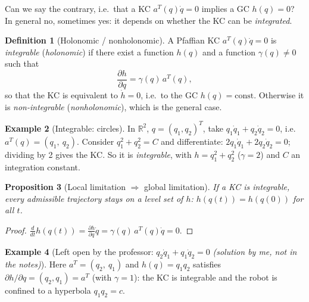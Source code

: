 \documentclass[11pt,a4paper]{article}
\theoremstyle{definition}
\newtheorem{definition}{Definition}[section]
\newtheorem{example}[definition]{Example}
\theoremstyle{plain}
\newtheorem{proposition}[definition]{Proposition}
\theoremstyle{remark}
\begin{document}
Can we say the contrary, i.e.\ that a KC $a^{T}(q)\dot q=0$ implies a GC $h(q)=0$? In general no, sometimes yes: it depends on whether the KC can be \emph{integrated}.
 
\begin{definition}[Holonomic / nonholonomic]
A Pfaffian KC $a^{T}(q)\dot q=0$ is \emph{integrable} (\emph{holonomic}) if there exist a function $h(q)$ and a function $\gamma(q)\neq0$ such that
\[
\frac{\partial h}{\partial q}=\gamma(q)\,a^{T}(q),
\]
so that the KC is equivalent to $\dot h=0$, i.e.\ to the GC $h(q)=\text{const}$. Otherwise it is \emph{non-integrable} (\emph{nonholonomic}), which is the general case.
\end{definition}
 
\begin{example}[Integrable: circles]\label{ex:circles}
In $\mathbb R^2$, $q=(q_1,q_2)^{T}$, take $q_1\dot q_1+q_2\dot q_2=0$, i.e.\ $a^{T}(q)=(q_1,\ q_2)$. Consider $q_1^2+q_2^2=C$ and differentiate: $2q_1\dot q_1+2q_2\dot q_2=0$; dividing by 2 gives the KC. So it is \emph{integrable}, with $h=q_1^2+q_2^2$ ($\gamma=2$) and $C$ an integration constant.
\end{example}
 
\begin{proposition}[Local limitation $\Rightarrow$ global limitation]\label{prop:l2g}
If a KC is integrable, every admissible trajectory stays on a level set of $h$: $h(q(t))=h(q(0))$ for all $t$.
\end{proposition}
\begin{proof}
$\frac{d}{dt}h(q(t))=\frac{\partial h}{\partial q}\dot q=\gamma(q)\,a^{T}(q)\dot q=0$.
\end{proof}
 
\begin{example}[Left open by the professor: $q_2\dot q_1+q_1\dot q_2=0$ \emph{(solution by me, not in the notes)}]
Here $a^{T}=(q_2,\ q_1)$ and $h(q)=q_1q_2$ satisfies $\partial h/\partial q=(q_2,q_1)=a^{T}$ (with $\gamma=1$): the KC is integrable and the robot is confined to a hyperbola $q_1q_2=c$.
\end{example}
 
\end{document}
